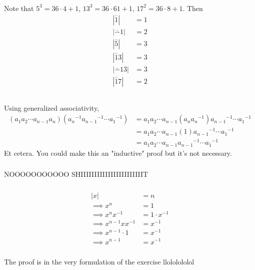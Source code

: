 \documentclass{article}
\newcommand{\abs}[1]{| #1 |}
\newcommand{\inv}[1]{ {#1}^{-1} }
\begin{document}
\subsubsection{}
Note that $5^3 = 36\cdot 4 + 1$, $13^3 = 36\cdot 61 + 1$, $17^2 = 36\cdot 8 +1 $. Then
\begin{align*}
\abs{\bar 1 } &= 1\\
\abs{\bar -1 } &= 2\\
\abs{\bar 5 } &= 3\\
\abs{\bar 13 } &= 3\\
\abs{\bar -13 } &= 3\\
\abs{\bar 17 } &= 2\\
\end{align*}
\subsubsection{}
Using generalized associativity,
\begin{align*}
(a_1a_2\cdots a_{n-1}a_n)(\inv{a_n}\inv{a_{n-1}}\cdots \inv{a_1})
&= a_1a_2\cdots a_{n-1}(a_n\inv{a_n})\inv{a_{n-1}}\cdots \inv{a_1}\\
&= a_1a_2\cdots a_{n-1}(1)\inv{a_{n-1}}\cdots \inv{a_1}\\
&= a_1a_2\cdots a_{n-1}\inv{a_{n-1}}\cdots \inv{a_1}
\end{align*}
Et cetera. You could make this an "inductive" proof but it's not necessary.
\subsubsection{}
NOOOOOOOOOOO SHIIIIIIIIIIIIIIIIIIIIIIIT
\subsubsection{}
\begin{align*}
\abs{x} &= n\\
\implies x^n &= 1\\
\implies x^n\inv{x} &= 1\cdot\inv{x}\\
\implies x^{n-1}x\inv{x} &= \inv{x}\\
\implies x^{n-1}\cdot 1 &= \inv{x}\\
\implies x^{n-1} &= \inv{x}
\end{align*}
\subsubsection{}
The proof is in the very formulation of the exercise llololololol
\end{document}
